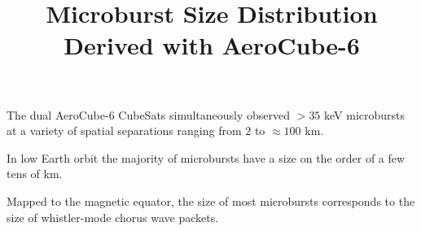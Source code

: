 \documentclass[draft]{agujournal2019}
\begin{document}
\title{Microburst Size Distribution Derived with AeroCube-6}

%
%





\begin{keypoints}
\item The dual AeroCube-6 CubeSats simultaneously observed $> 35$ keV microbursts at a variety of spatial separations ranging from $2$ to $\approx 100$ km.
\item In low Earth orbit the majority of microbursts have a size on the order of a few tens of km.
\item Mapped to the magnetic equator, the size of most microbursts corresponds to the size of whistler-mode chorus wave packets.
\end{keypoints}

%
%

\end{document}
